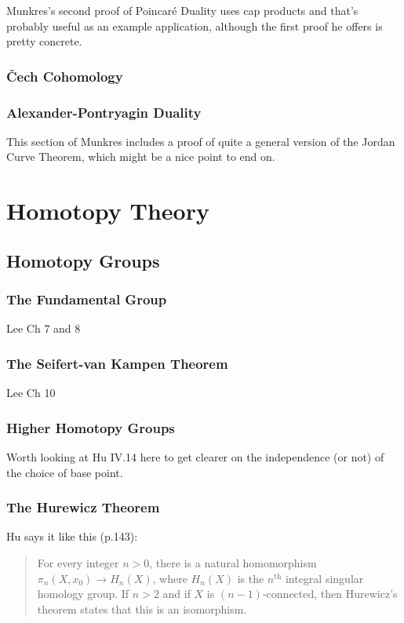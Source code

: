 \documentclass[oneside,english]{amsbook}
\numberwithin{section}{chapter}
\theoremstyle{plain}
\theoremstyle{definition}
\providecommand{\Cech}{\v{C}ech }
\begin{document}
	Munkres's second proof of Poincar\'e Duality uses cap products and that's probably useful as an example application, although the first proof he offers is pretty concrete.
	
	\section{\Cech Cohomology}
	\section{Alexander-Pontryagin Duality}
	
	This section of Munkres includes a proof of quite a general version of the Jordan Curve Theorem, which might be a nice point to end on.
	
	\part{Homotopy Theory}
	
	\chapter{Homotopy Groups}
	
	\section{The Fundamental Group}
	
	Lee Ch 7 and 8
	
	\section{The Seifert-van Kampen Theorem}
	
	Lee Ch 10
	
	\section{Higher Homotopy Groups}
	
	Worth looking at Hu IV.14 here to get clearer on the independence (or not) of the choice of base point.

	\section{The Hurewicz Theorem}
	
	Hu says it like this (p.143):
	\begin{quote}
		For every integer $n > 0$, there is a natural homomorphism $\pi_n(X, x_0)\to H_n(X)$, where $H_n(X)$ is the $n^\text{th}$ integral singular homology group. If $n > 2$ and if $X$ is $(n - 1)$-connected, then Hurewicz's theorem states that this is an isomorphism. 
	\end{quote}
	
\end{document}
